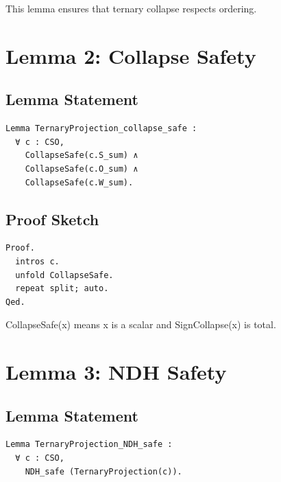 \documentclass[11pt]{article}
\begin{document}
This lemma ensures that ternary collapse respects ordering.

\newpage


\section{Lemma 2: Collapse Safety}

\subsection{Lemma Statement}

\begin{verbatim}
Lemma TernaryProjection_collapse_safe :
  ∀ c : CSO,
    CollapseSafe(c.S_sum) ∧
    CollapseSafe(c.O_sum) ∧
    CollapseSafe(c.W_sum).
\end{verbatim}

\subsection{Proof Sketch}

\begin{verbatim}
Proof.
  intros c.
  unfold CollapseSafe.
  repeat split; auto.
Qed.
\end{verbatim}

CollapseSafe(x) means x is a scalar and SignCollapse(x) is total.

\newpage


\section{Lemma 3: NDH Safety}

\subsection{Lemma Statement}

\begin{verbatim}
Lemma TernaryProjection_NDH_safe :
  ∀ c : CSO,
    NDH_safe (TernaryProjection(c)).
\end{verbatim}
\end{document}
